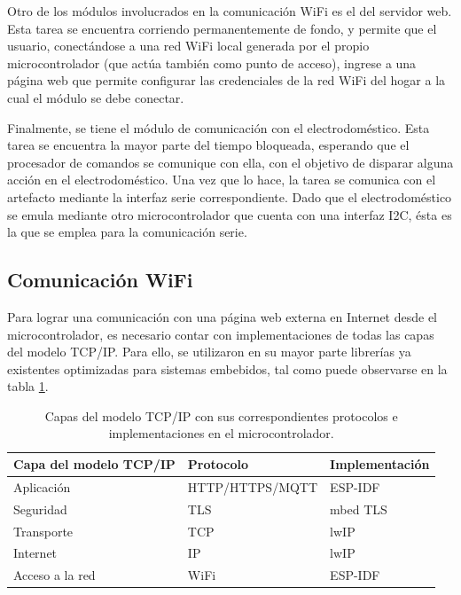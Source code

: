 Otro de los módulos involucrados en la comunicación WiFi es el del servidor web. Esta tarea se encuentra corriendo permanentemente de fondo, y permite que el usuario, conectándose a una red WiFi local generada por el propio microcontrolador (que actúa también como punto de acceso), ingrese a una página web que permite configurar las credenciales de la red WiFi del hogar a la cual el módulo se debe conectar.

Finalmente, se tiene el módulo de comunicación con el electrodoméstico. Esta tarea se encuentra la mayor parte del tiempo bloqueada, esperando que el procesador de comandos se comunique con ella, con el objetivo de disparar alguna acción en el electrodoméstico. Una vez que lo hace, la tarea se comunica con el artefacto mediante la interfaz serie correspondiente. Dado que el electrodoméstico se emula mediante otro microcontrolador que cuenta con una interfaz I2C, ésta es la que se emplea para la comunicación serie.


\subsection{Comunicación WiFi}

Para lograr una comunicación con una página web externa en Internet desde el microcontrolador, es necesario contar con implementaciones de todas las capas del modelo TCP/IP. Para ello, se utilizaron en su mayor parte librerías ya existentes optimizadas para sistemas embebidos, tal como puede observarse en la tabla \ref{tab:implementacion_capas}.


\begin{table}[h]
	\centering
	\caption{Capas del modelo TCP/IP con sus correspondientes protocolos e implementaciones en el microcontrolador.}
	\begin{tabular}{l l l}    
		\toprule
		\textbf{Capa del modelo TCP/IP}	& \textbf{Protocolo}	& \textbf{Implementación}	\\
		\midrule
		Aplicación			& HTTP/HTTPS/MQTT		& ESP-IDF					\\
		Seguridad			& TLS					& mbed TLS					\\
		Transporte			& TCP					& lwIP						\\
		Internet			& IP					& lwIP						\\
		Acceso a la red 	& WiFi					& ESP-IDF					\\
		\bottomrule
		\hline
	\end{tabular}
	\label{tab:implementacion_capas}
\end{table}

